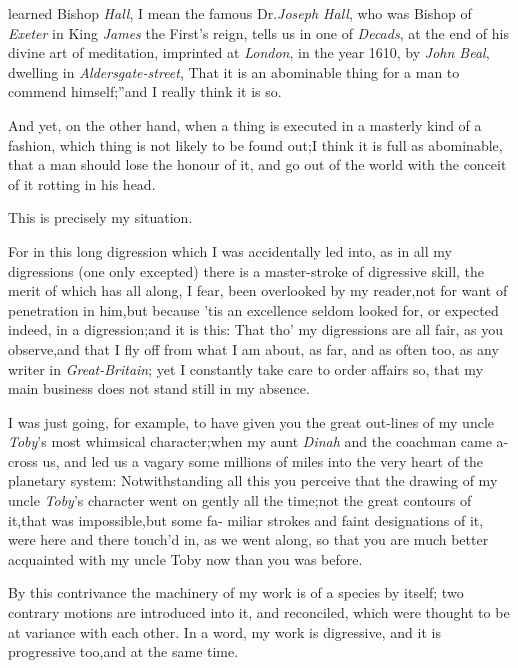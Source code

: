 \documentclass{article}
\begin{document}
 learned Bishop \textit{Hall}, I mean\break 
the famous Dr.\@ \textit{Joseph Hall}, who\break
was Bishop of
\textit{Exeter} in King \textit{James} the First’s reign, tells
us in one of \textit{Decads}, at the end of his divine art of
meditation, imprinted at \textit{London}, in the year 1610, by
\textit{John Beal}, dwelling in
\textit{Aldersgate-street},
\noindent \lqq That it is an abominable thing for a man to commend himself;”\tsh and I
really think it is so.

And yet, on the other hand, when a thing is executed in a
masterly kind of a fashion, which thing is not likely to be found
out;\tsk I think it is full as abominable, that a man should lose
the honour of it, and go out of the world with the conceit of it
rotting in his head.

This is precisely my situation.

For in this long digression which I was accidentally led into,
as in all my digressions (one only excepted) there is a
master-stroke of digressive skill, the merit of which has all
along, I fear, been overlooked by my reader,\tsk not for want of
penetration in him,\tsk but because ’tis an excellence
seldom looked for, or expected indeed, in a digression;\tsk and
it is this: That tho’ my digressions are all fair, as you
observe,\tsk and that I fly off from what I am about, as far, and
as often too, as any writer in \textit{Great-Britain}; yet I
constantly take care to order affairs so, that my main business does
not stand still in my absence.

I was just going, for example, to have given you the great
out-lines of my uncle \textit{Toby}’s most whimsical
character;\tsk when my aunt \textit{Dinah} and the coachman came
a-cross us, and led us a vagary some millions of miles into the very
heart of the planetary system: Notwithstanding all this you
perceive that the drawing of my uncle \textit{Toby}’s character
went on gently all the time;\tsk not the great contours of
it,\tsk that was impossible,\tsk but some fa- miliar strokes and
faint designations of it, were here and there touch’d in, as
we went along, so that you are much better acquainted with my uncle
Toby now than you was before.

By this contrivance the machinery of my work is of a species by
itself; two contrary motions are introduced into it, and
reconciled, which were thought to be at variance with each other.
In a word, my work is digressive, and it is progressive
too,\tsk and at the same time.
\end{document}
